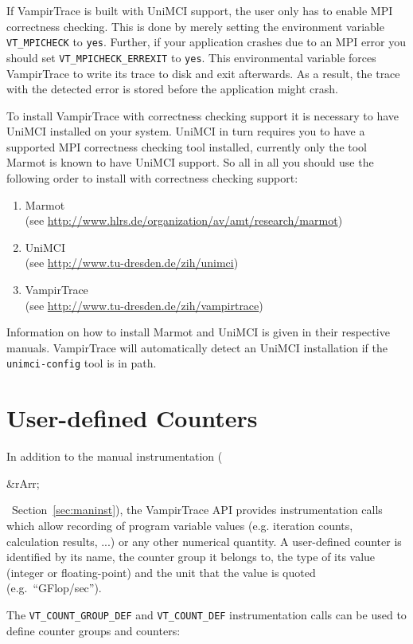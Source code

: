 \documentclass[a4paper,twoside,12pt,BCOR12mm]{scrbook}
\newcommand{\rarr}{$\Rightarrow$}  %
\renewcommand{\rarr}{\begin{rawhtml}&rArr;\end{rawhtml}}   %
\begin{document}
  If VampirTrace is built with UniMCI support, the user only has to enable MPI correctness checking. This is done by merely setting the environment
  variable \texttt{VT\_MPICHECK} to \texttt{yes}. Further, if your application crashes due to an MPI error you should set
  \texttt{VT\_MPICHECK\_ERREXIT} to \texttt{yes}. This environmental variable forces VampirTrace to write its trace to disk and exit afterwards. As
  a result, the trace with the detected error is stored before the application might crash.

  To install VampirTrace with correctness checking support it is necessary to have UniMCI installed on your system. UniMCI in turn requires you to
  have a supported MPI correctness checking tool installed, currently only the tool Marmot is known to have UniMCI support. So all in all you should
  use the following order to install with correctness checking support:
  \begin{enumerate}
    \item Marmot\\
    (see \url{http://www.hlrs.de/organization/av/amt/research/marmot})
    \item UniMCI\\
    (see \url{http://www.tu-dresden.de/zih/unimci})
    \item VampirTrace\\
    (see \url{http://www.tu-dresden.de/zih/vampirtrace})
  \end{enumerate}

  Information on how to install Marmot and UniMCI is given in their respective manuals. VampirTrace will automatically detect an UniMCI installation
  if the \texttt{unimci-config} tool is in path.

\section{User-defined Counters}
\label{sec:userdefinedcounters}

  In addition to the manual instrumentation (\rarr\ Section~\ref{sec:maninst}), the VampirTrace API
  provides instrumentation calls which allow recording of 
  program variable values (e.g. iteration counts, calculation results, ...) or any other 
  numerical quantity.
  A user-defined counter is identified by its name, the counter group it belongs to,
  the type of its value (integer or floating-point) and the unit that the value is 
  quoted (e.g.~``GFlop/sec'').

  The \texttt{VT\_COUNT\_GROUP\_DEF} and \texttt{VT\_COUNT\_DEF} instrumentation
  calls can be used to define counter groups and counters:
\end{document}
